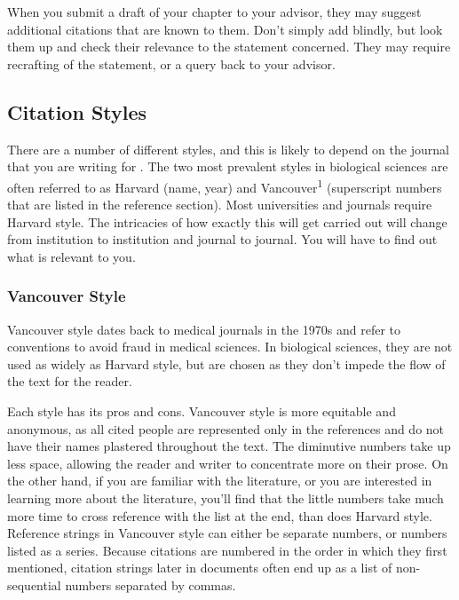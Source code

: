 \documentclass[
]{krantz}
\begin{document}
When you submit a draft of your chapter to your advisor, they may suggest additional citations that are known to them. Don't simply add blindly, but look them up and check their relevance to the statement concerned. They may require recrafting of the statement, or a query back to your advisor.

\hypertarget{citation-styles}{%
\subsection{Citation Styles}\label{citation-styles}}

There are a number of different styles, and this is likely to depend on the journal that you are writing for \citep[see][]{pandey2020methods}. The two most prevalent styles in biological sciences are often referred to as Harvard (name, year) and Vancouver\textsuperscript{1} (superscript numbers that are listed in the reference section). Most universities and journals require Harvard style. The intricacies of how exactly this will get carried out will change from institution to institution and journal to journal. You will have to find out what is relevant to you.

\hypertarget{vancouver-style}{%
\subsubsection{Vancouver Style}\label{vancouver-style}}

Vancouver style dates back to medical journals in the 1970s and refer to conventions to avoid fraud in medical sciences. In biological sciences, they are not used as widely as Harvard style, but are chosen as they don't impede the flow of the text for the reader.

Each style has its pros and cons. Vancouver style is more equitable and anonymous, as all cited people are represented only in the references and do not have their names plastered throughout the text. The diminutive numbers take up less space, allowing the reader and writer to concentrate more on their prose. On the other hand, if you are familiar with the literature, or you are interested in learning more about the literature, you'll find that the little numbers take much more time to cross reference with the list at the end, than does Harvard style. Reference strings in Vancouver style can either be separate numbers, or numbers listed as a series. Because citations are numbered in the order in which they first mentioned, citation strings later in documents often end up as a list of non-sequential numbers separated by commas.
\end{document}

